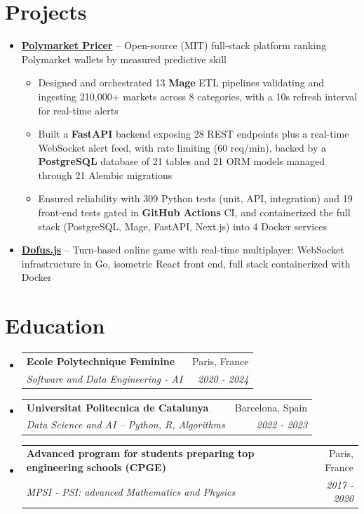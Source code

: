 \documentclass[letterpaper,11pt]{article}
\makeatletter
\newcommand{\resumeItem}[2]{
  \item\small{
    \textbf{#1}{ #2 \vspace{-2pt}}
  }
}
\newcommand{\resumeSubheading}[4]{
  \vspace{-1pt}\item
    \begin{tabular*}{0.97\textwidth}{l@{\extracolsep{\fill}}r}
      \textbf{#1} & #2 \\
      \textit{\small#3} & \textit{\small #4} \\
    \end{tabular*}\vspace{-5pt}
}
\newcommand{\resumeSubItem}[2]{\resumeItem{#1}{#2}\vspace{-4pt}}
\newcommand{\resumeSubHeadingListStart}{\begin{itemize}[leftmargin=*]}
\newcommand{\resumeSubHeadingListEnd}{\end{itemize}}
\newcommand{\resumeItemListStart}{\begin{itemize}}
\newcommand{\resumeItemListEnd}{\end{itemize}\vspace{-5pt}}
\makeatother
\begin{document}
\section{Projects}
  \resumeSubHeadingListStart

   \resumeItem{\href{https://github.com/AntoineROYERB/polymarketpricer}{Polymarket Pricer}}{-- Open-source (MIT) full-stack platform ranking Polymarket wallets by measured predictive skill}
    \vspace{-6pt}
    \resumeItemListStart
        \resumeItem{}
            {Designed and orchestrated 13 \textbf{Mage} ETL pipelines validating and ingesting 210,000+ markets across 8 categories, with a 10s refresh interval for real-time alerts}
        \resumeItem{}
            {Built a \textbf{FastAPI} backend exposing 28 REST endpoints plus a real-time WebSocket alert feed, with rate limiting (60 req/min), backed by a \textbf{PostgreSQL} database of 21 tables and 21 ORM models managed through 21 Alembic migrations}
        \resumeItem{}
            {Ensured reliability with 309 Python tests (unit, API, integration) and 19 front-end tests gated in \textbf{GitHub Actions} CI, and containerized the full stack (PostgreSQL, Mage, FastAPI, Next.js) into 4 Docker services}
    \resumeItemListEnd
  
    \resumeSubItem{\href{https://github.com/AntoineROYERB/dofus.js}{Dofus.js}}{-- Turn-based online game with real-time multiplayer: WebSocket infrastructure in Go, isometric React front end, full stack containerized with Docker
}

  \resumeSubHeadingListEnd

\section{Education}
  \resumeSubHeadingListStart
  
    \resumeSubheading
          {Ecole Polytechnique Feminine}{Paris, France}
      {Software and Data Engineering - AI}{2020 - 2024}
      
    \resumeSubheading
      {Universitat Politecnica de Catalunya}{Barcelona, Spain}
{Data Science and AI – Python, R, Algorithms}{2022 - 2023}

    \resumeSubheading
      {
\textbf{ Advanced program for students preparing top engineering schools (CPGE)}}{Paris, France} 
      {MPSI - PSI:  advanced Mathematics and Physics}{2017 - 2020}


  \resumeSubHeadingListEnd
\end{document}
